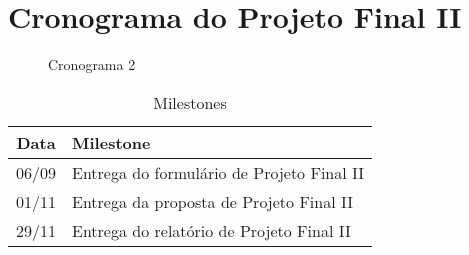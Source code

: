 \section{Cronograma do Projeto Final II}

\begin{figure}[ht]
    \begin{center}
    
    \caption{Cronograma 2}
    \label{fig:cronograma-planejado}
    \end{center}
\end{figure}

\begin{table}[h]
    \centering
    \caption{Milestones}
    \begin{tabular}{|c|l|}
        \hline
        \textbf{Data} & \textbf{Milestone} \\
        \hline
        06/09 & Entrega do formulário de Projeto Final II \\
        01/11 & Entrega da proposta de Projeto Final II \\
        29/11 & Entrega do relatório de Projeto Final II \\
        \hline
    \end{tabular}
\end{table}